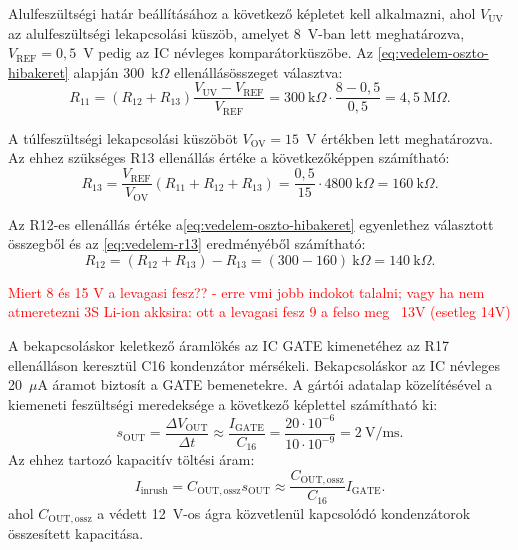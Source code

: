 Alulfeszültségi határ beállításához a következő képletet kell alkalmazni, ahol 
$V_{\mathrm{UV}}$ az alulfeszültségi lekapcsolási küszöb, amelyet 8~V-ban lett meghatározva, 
$V_{\mathrm{REF}}=0{,}5$~V pedig az IC névleges komparátorküszöbe. 
Az \eqref{eq:vedelem-oszto-hibakeret} alapján 300~k$\Omega$ ellenállásösszeget választva:
\begin{equation}
    R_{11}
    =(R_{12}+R_{13})\frac{V_{\mathrm{UV}}-V_{\mathrm{REF}}}{V_{\mathrm{REF}}}
    =300~\mathrm{k}\Omega\cdot\frac{8-0{,}5}{0{,}5}
    =4{,}5~\mathrm{M}\Omega.
    \label{eq:vedelem-r11}
\end{equation}

A túlfeszültségi lekapcsolási küszöböt $V_{\mathrm{OV}}=15$~V értékben lett meghatározva. 
Az ehhez szükséges R13 ellenállás értéke a következőképpen számítható:
\begin{equation}
    R_{13}
    =\frac{V_{\mathrm{REF}}}{V_{\mathrm{OV}}}(R_{11}+R_{12}+R_{13})
    =\frac{0{,}5}{15}\cdot4800~\mathrm{k}\Omega
    =160~\mathrm{k}\Omega.
    \label{eq:vedelem-r13}
\end{equation}

Az R12-es ellenállás értéke a\eqref{eq:vedelem-oszto-hibakeret} egyenlethez választott összegből 
és az \eqref{eq:vedelem-r13} eredményéből számítható:
\begin{equation}
    R_{12} = (R_{12}+R_{13})-R_{13}
    =(300-160)~\mathrm{k}\Omega=140~\mathrm{k}\Omega.
    \label{eq:vedelem-r12}
\end{equation}

\textcolor{red}{Miert 8 és 15 V a levagasi fesz?? - erre vmi jobb indokot talalni; vagy ha nem
atmeretezni 3S Li-ion akksira: ott a levagasi fesz 9 a felso meg ~13V (esetleg 14V)}

A bekapcsoláskor keletkező áramlökés az IC GATE kimenetéhez az R17
ellenálláson keresztül C16 kondenzátor mérsékeli. 
Bekapcsoláskor az IC névleges 20~$\mu$A áramot biztosít a GATE bemenetekre.
A gártói adatalap közelítésével a kiemeneti feszültségi meredeksége a következő képlettel számítható ki:
\begin{equation}
    s_{\mathrm{OUT}}=\frac{\Delta V_{\mathrm{OUT}}}{\Delta t} \approx \frac{I_\mathrm{GATE}}{C_{16}}
    = \frac{20\cdot10^{-6}}{10\cdot10^{-9}}
    = 2~\mathrm{V/ms}.
    \label{eq:vedelem-felfutasi-meredekseg}
\end{equation}
Az ehhez tartozó kapacitív töltési áram:
\begin{equation}
    I_{\mathrm{inrush}}=C_{\mathrm{OUT,ossz}}s_{\mathrm{OUT}}
    \approx\frac{C_{\mathrm{OUT,ossz}}}{C_{16}}I_{\mathrm{GATE}}.
    \label{eq:vedelem-inrush-altalanos}
\end{equation}
ahol $C_{\mathrm{OUT,ossz}}$ a védett 12~V-os ágra közvetlenül kapcsolódó kondenzátorok összesített kapacitása.

